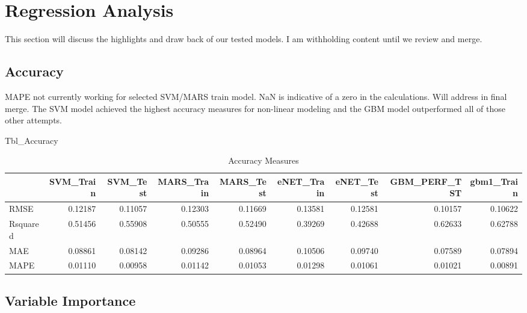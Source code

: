\documentclass[]{report}
\newenvironment{Shaded}{\begin{snugshade}}{\end{snugshade}}
\newcommand{\NormalTok}[1]{#1}
\begin{document}
\hypertarget{regression-analysis}{%
\chapter{Regression Analysis}\label{regression-analysis}}

This section will discuss the highlights and draw back of our tested
models. I am withholding content until we review and merge.

\hypertarget{accuracy}{%
\section{Accuracy}\label{accuracy}}

MAPE not currently working for selected SVM/MARS train model. NaN is
indicative of a zero in the calculations. Will address in final merge.
The SVM model achieved the highest accuracy measures for non-linear
modeling and the GBM model outperformed all of those other attempts.

\begin{Shaded}
\begin{Highlighting}[]
\NormalTok{Tbl_Accuracy}
\end{Highlighting}
\end{Shaded}

\begin{table}[H]

\caption{\label{tab:source-script}Accuracy Measures}
\centering
\fontsize{8}{10}\selectfont
\begin{tabular}{lrrrrrrrr}
\toprule
  & SVM\_Train & SVM\_Test & MARS\_Train & MARS\_Test & eNET\_Train & eNET\_Test & GBM\_PERF\_TST & gbm1\_Train\\
\midrule
\rowcolor{gray!6}  RMSE & 0.12187 & 0.11057 & 0.12303 & 0.11669 & 0.13581 & 0.12581 & 0.10157 & 0.10622\\
Rsquared & 0.51456 & 0.55908 & 0.50555 & 0.52490 & 0.39269 & 0.42688 & 0.62633 & 0.62788\\
\rowcolor{gray!6}  MAE & 0.08861 & 0.08142 & 0.09286 & 0.08964 & 0.10506 & 0.09740 & 0.07589 & 0.07894\\
MAPE & 0.01110 & 0.00958 & 0.01142 & 0.01053 & 0.01298 & 0.01061 & 0.01021 & 0.00891\\
\bottomrule
\end{tabular}
\end{table}

\hypertarget{variable-importance}{%
\section{Variable Importance}\label{variable-importance}}
\end{document}
